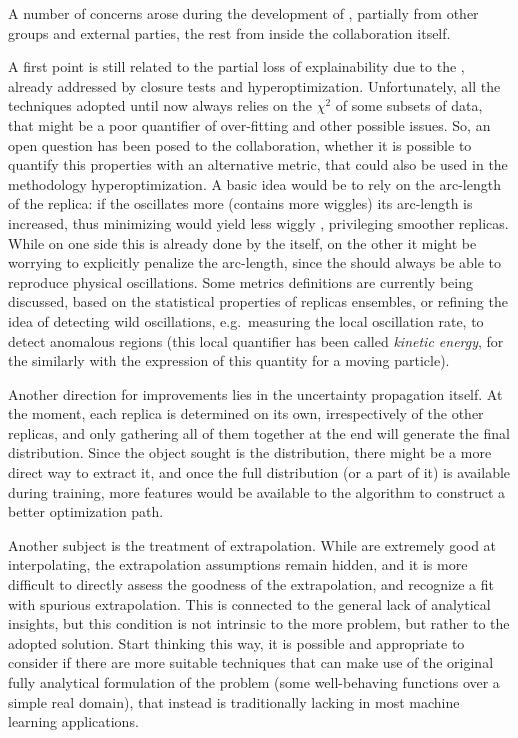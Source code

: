 
A number of concerns arose during the development of \nnpdf, partially from
other \pdf groups and external parties, the rest from inside the collaboration
itself.

A first point is still related to the partial loss of explainability due to the
\nn, already addressed by closure tests and hyperoptimization.
%
Unfortunately, all the techniques adopted until now always relies on the
$\chi^2$ of some subsets of data, that might be a poor quantifier of
over-fitting and other possible issues.
%
So, an open question has been posed to the collaboration, whether it is
possible to quantify this properties with an alternative metric, that could
also be used in the methodology hyperoptimization.
%
A basic idea would be to rely on the arc-length of the \pdf replica: if the
\pdf oscillates more (contains more wiggles) its arc-length is increased, thus
minimizing would yield less wiggly \pdfs, privileging smoother replicas.
%
While on one side this is already done by the \nn itself, on the other it might
be worrying to explicitly penalize the arc-length, since the \pdf should always
be able to reproduce physical oscillations.
%
Some metrics definitions are currently being discussed, based on the
statistical properties of replicas ensembles, or refining the idea of detecting
wild oscillations, e.g.\ measuring the local oscillation rate, to detect
anomalous regions (this local quantifier has been called \textit{kinetic
energy}, for the similarly with the expression of this quantity for a moving
particle).

Another direction for improvements lies in the uncertainty propagation itself.
At the moment, each replica is determined on its own, irrespectively of the
other replicas, and only gathering all of them together at the end will
generate the final \pdfs distribution.
%
Since the object sought is the distribution, there might be a more direct way
to extract it, and once the full distribution (or a part of it) is available
during training, more features would be available to the algorithm to construct
a better optimization path.

Another subject is the treatment of extrapolation. While  are
extremely good at interpolating, the extrapolation assumptions remain hidden,
and it is more difficult to directly assess the goodness of the extrapolation,
and recognize a fit with spurious extrapolation.
%
This is connected to the general lack of analytical insights, but this
condition is not intrinsic to the more problem, but rather to the adopted
solution.
%
Start thinking this way, it is possible and appropriate to consider if there
are more suitable techniques that can make use of the original fully analytical
formulation of the problem (some well-behaving functions over a simple real
domain), that instead is traditionally lacking in most machine learning
applications.
